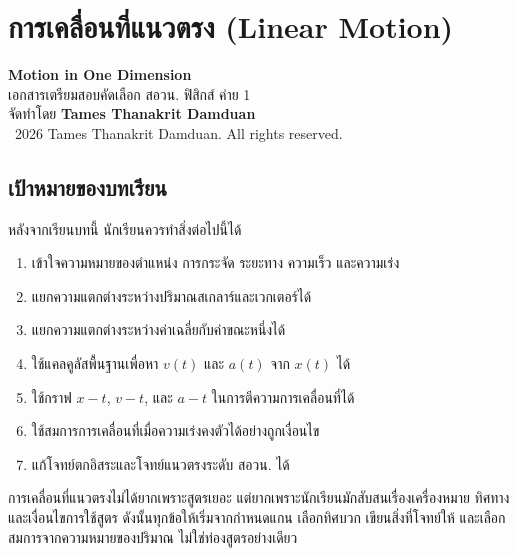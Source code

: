 \documentclass[12pt,a4paper]{report}
\begin{document}



\chapter{การเคลื่อนที่แนวตรง (Linear Motion)}
\begin{center}
    {\Large \textbf{Motion in One Dimension}}\\[4pt]
    {\normalsize เอกสารเตรียมสอบคัดเลือก สอวน. ฟิสิกส์ ค่าย 1}\\[6pt]
    {\normalsize จัดทำโดย \textbf{Tames Thanakrit Damduan}}\\[2pt]
    {\footnotesize \textcopyright\ 2026 Tames Thanakrit Damduan. All rights reserved.}\\[8pt]
\end{center}

\section*{เป้าหมายของบทเรียน}

หลังจากเรียนบทนี้ นักเรียนควรทำสิ่งต่อไปนี้ได้

\begin{enumerate}
    \item เข้าใจความหมายของตำแหน่ง การกระจัด ระยะทาง ความเร็ว และความเร่ง
    \item แยกความแตกต่างระหว่างปริมาณสเกลาร์และเวกเตอร์ได้
    \item แยกความแตกต่างระหว่างค่าเฉลี่ยกับค่าขณะหนึ่งได้
    \item ใช้แคลคูลัสพื้นฐานเพื่อหา $v(t)$ และ $a(t)$ จาก $x(t)$ ได้
    \item ใช้กราฟ $x-t$, $v-t$, และ $a-t$ ในการตีความการเคลื่อนที่ได้
    \item ใช้สมการการเคลื่อนที่เมื่อความเร่งคงตัวได้อย่างถูกเงื่อนไข
    \item แก้โจทย์ตกอิสระและโจทย์แนวตรงระดับ สอวน. ได้
\end{enumerate}

\begin{tcolorbox}[title=แนวคิดสำคัญของบทนี้]
การเคลื่อนที่แนวตรงไม่ได้ยากเพราะสูตรเยอะ แต่ยากเพราะนักเรียนมักสับสนเรื่องเครื่องหมาย ทิศทาง และเงื่อนไขการใช้สูตร ดังนั้นทุกข้อให้เริ่มจากกำหนดแกน เลือกทิศบวก เขียนสิ่งที่โจทย์ให้ และเลือกสมการจากความหมายของปริมาณ ไม่ใช่ท่องสูตรอย่างเดียว
\end{tcolorbox}
\newpage{}
\end{document}
